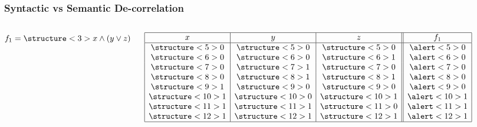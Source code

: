 \documentclass{beamer}
\newcommand{\AND}{\land}
\newcommand{\OR}{\lor}
\begin{document}
\frame
{
  \frametitle{Syntactic vs Semantic De-correlation}
  \begin{columns}[c]
    \column{1.5in}

    $f_1 = \structure<3>{x \AND (y \OR z)}$


    \begin{table}
      {\small
      $
      \begin{array}{|c|c|c||c|}
        \hline
        x & y & z & f_1\\
        \hline
        \structure<5>{0} & \structure<5>{0} & \structure<5>{0} & \alert<5>{0}\\
        \structure<6>{0} & \structure<6>{0} & \structure<6>{1} & \alert<6>{0}\\
        \structure<7>{0} & \structure<7>{1} & \structure<7>{0} & \alert<7>{0}\\
        \structure<8>{0} & \structure<8>{1} & \structure<8>{1} & \alert<8>{0}\\
        \structure<9>{1} & \structure<9>{0} & \structure<9>{0} & \alert<9>{0}\\
        \structure<10>{1} & \structure<10>{0} & \structure<10>{1} & \alert<10>{1}\\
        \structure<11>{1} & \structure<11>{1} & \structure<11>{0} & \alert<11>{1}\\
        \structure<12>{1} & \structure<12>{1} & \structure<12>{1} & \alert<12>{1}\\
        \hline
      \end{array}
      $
      }
    \end{table}

    \column{1.5in}


\end{columns}}
\end{document}
